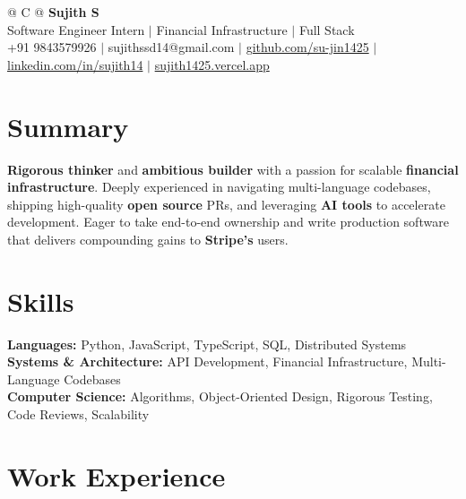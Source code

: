 \documentclass[a4paper,10pt]{article}
\newcommand{\ulink}[2]{\href{#1}{#2}}
\begin{document}
\pagestyle{empty}

\begin{tabularx}{\linewidth}{@{} C @{}}
{\color[HTML]{000000}\fontsize{30}{35}\selectfont\bfseries Sujith S} \\[5pt]
{\fontsize{10.5}{12.5}\selectfont\color[HTML]{3A3A3A}
Software Engineer Intern $|$ Financial Infrastructure $|$ Full Stack} \\[6pt]
{\fontsize{9.5}{11.5}\selectfont\textcolor[HTML]{3A3A3A}{+91 9843579926 $|$ sujithssd14@gmail.com $|$ \ulink{https://github.com/su-jin1425}{github.com/su-jin1425} $|$ \ulink{https://linkedin.com/in/sujith14}{linkedin.com/in/sujith14} $|$ \ulink{https://sujith1425.vercel.app}{sujith1425.vercel.app}}}
\end{tabularx}

\section{Summary}
\vspace{2pt}

{\color[HTML]{0A0A0A}\fontsize{11}{14}\selectfont
\textbf{Rigorous thinker} and \textbf{ambitious builder} with a passion for scalable \textbf{financial infrastructure}. Deeply experienced in navigating multi-language codebases, shipping high-quality \textbf{open source} PRs, and leveraging \textbf{AI tools} to accelerate development. Eager to take end-to-end ownership and write production software that delivers compounding gains to \textbf{Stripe's} users.}

\section{Skills}
\vspace{2pt}

{\color[HTML]{0A0A0A}\fontsize{11}{14}\selectfont
\textbf{Languages:} Python, JavaScript, TypeScript, SQL, Distributed Systems \\[2pt]
\textbf{Systems \& Architecture:} API Development, Financial Infrastructure, Multi-Language Codebases \\[2pt]
\textbf{Computer Science:} Algorithms, Object-Oriented Design, Rigorous Testing, Code Reviews, Scalability}

\section{Work Experience}
\vspace{2pt}
\end{document}
